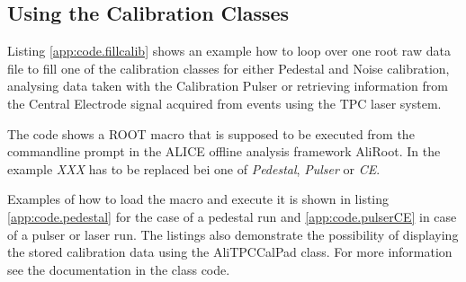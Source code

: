 \subsection{Using the Calibration Classes} \label{app:code.calib}
Listing \ref{app:code.fillcalib} shows an example how to loop over one root raw data file to fill one of the calibration classes for either Pedestal and Noise calibration, analysing data taken with the Calibration Pulser or retrieving information from the Central Electrode signal acquired from events using the TPC laser system.

The code shows a ROOT macro that is supposed to be executed from the commandline prompt in the ALICE offline analysis framework AliRoot. In the example {\em XXX} has to be replaced bei one of {\em Pedestal}, {\em Pulser} or {\em CE}.

Examples of how to load the macro and execute it is shown in listing \ref{app:code.pedestal} for the case of a pedestal run and \ref{app:code.pulserCE} in case of a pulser or laser run. The listings also demonstrate the possibility of displaying the stored calibration data using the AliTPCCalPad class. For more information see the documentation in the class code.


